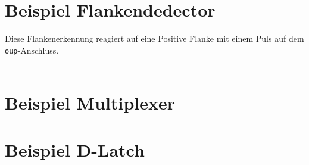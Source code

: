 \begin{minipage}[t]{0.485\textwidth}
	\section{Beispiel Flankendedector}
	Diese Flankenerkennung reagiert auf eine Positive Flanke mit einem Puls auf dem \texttt{oup}-Anschluss.\\[5pt]
	\\
	

\end{minipage} \hspace{0.01\textwidth}
\begin{minipage}[t]{0.485\textwidth}
	\section{Beispiel Multiplexer}
	
	\section{Beispiel D-Latch}
	
\end{minipage}
